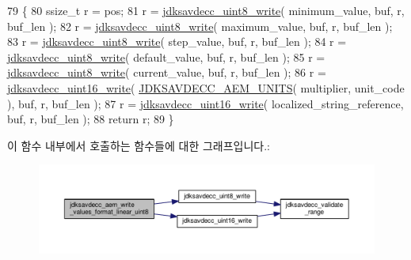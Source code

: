 \begin{DoxyCode}
79 \{
80     ssize\_t r = pos;
81     r = \hyperlink{group__endian_ga76773f9a39ae810aec586d2bb3b617e5}{jdksavdecc\_uint8\_write}( minimum\_value, buf, r, buf\_len );
82     r = \hyperlink{group__endian_ga76773f9a39ae810aec586d2bb3b617e5}{jdksavdecc\_uint8\_write}( maximum\_value, buf, r, buf\_len );
83     r = \hyperlink{group__endian_ga76773f9a39ae810aec586d2bb3b617e5}{jdksavdecc\_uint8\_write}( step\_value, buf, r, buf\_len );
84     r = \hyperlink{group__endian_ga76773f9a39ae810aec586d2bb3b617e5}{jdksavdecc\_uint8\_write}( default\_value, buf, r, buf\_len );
85     r = \hyperlink{group__endian_ga76773f9a39ae810aec586d2bb3b617e5}{jdksavdecc\_uint8\_write}( current\_value, buf, r, buf\_len );
86     r = \hyperlink{group__endian_ga4c0851ce17bde5306fdb04bfb5b75af1}{jdksavdecc\_uint16\_write}( \hyperlink{group__aem__descriptor_gae5f7498f6048b4dda1aca923b0eae0f6}{JDKSAVDECC\_AEM\_UNITS}( 
      multiplier, unit\_code ), buf, r, buf\_len );
87     r = \hyperlink{group__endian_ga4c0851ce17bde5306fdb04bfb5b75af1}{jdksavdecc\_uint16\_write}( localized\_string\_reference, buf, r, buf\_len );
88     \textcolor{keywordflow}{return} r;
89 \}
\end{DoxyCode}


이 함수 내부에서 호출하는 함수들에 대한 그래프입니다.\+:
\nopagebreak
\begin{figure}[H]
\begin{center}
\leavevmode
\includegraphics[width=350pt]{group__aem__descriptor_ga0f8ecbe72620dcfd4b849e96813d51b0_cgraph}
\end{center}
\end{figure}


